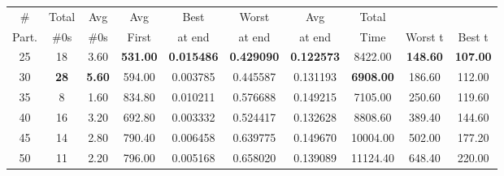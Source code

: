 \begin{table}[h]
	\centering
	\begin{tabular}{cccccccccc}
		\hline
		\cellcolor[HTML]{C0C0C0}\#       & Total   & Avg   & Avg     & Best    & Worst   & Avg  & Total   &       &                            \\
		\cellcolor[HTML]{C0C0C0} Part. &     \#0s & \#0s   &First  &  at end  & at end &at end & Time & Worst t  &          Best t                     \\ 
		\hline
		\cellcolor[HTML]{C0C0C0}25          & 18            & {\color[HTML]{3166FF} 3.60} & \textbf{531.00}                & \textbf{0.015486}               & \textbf{0.429090}               & \textbf{0.122573}               & 8422.00                         & \textbf{148.60}                & \textbf{107.00}               \\
		\cellcolor[HTML]{C0C0C0}30          & \textbf{28}           & \textbf{5.60}               & {\color[HTML]{3166FF} 594.00}  & {\color[HTML]{3166FF} 0.003785} & {\color[HTML]{3166FF} 0.445587} & {\color[HTML]{3166FF} 0.131193} & \textbf{6908.00}                & {\color[HTML]{3166FF} 186.60}  & {\color[HTML]{3166FF} 112.00} \\
		\cellcolor[HTML]{C0C0C0}35          & 8             & 1.60                        & 834.80                         & 0.010211                        & 0.576688                        & 0.149215                        & {\color[HTML]{3166FF} 7105.00}  & 250.60                         & 119.60                        \\
		\cellcolor[HTML]{C0C0C0}40          & 16            & 3.20                        & 692.80                         & 0.003332                        & 0.524417                        & 0.132628                        & 8808.60                         & 389.40                         & 144.60                        \\
		\cellcolor[HTML]{C0C0C0}45          & 14            & 2.80                        & 790.40                         & 0.006458                        & 0.639775                        & {\color[HTML]{FE0000} 0.149670} & 10004.00                        & 502.00                         & 177.20                        \\
		\cellcolor[HTML]{C0C0C0}50          & 11            & 2.20                        & 796.00                         & {\color[HTML]{FE0000} 0.005168} & {\color[HTML]{FE0000} 0.658020} & 0.139089                        & 11124.40                        & 648.40                         & 220.00                        \\

\end{tabular}
\end{table}
